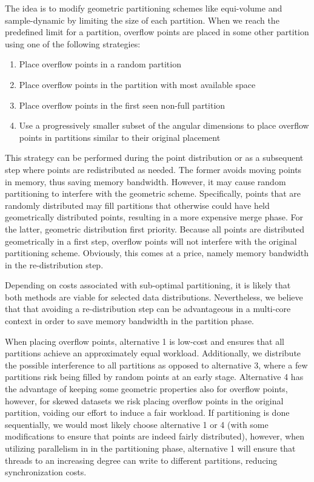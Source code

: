 \documentclass[12pt,a4paper,twoside]{report}
\begin{document}
The idea is to modify geometric partitioning schemes like equi-volume
and sample-dynamic by limiting the size of each partition. When we
reach the predefined limit for a partition, overflow points are placed
in some other partition using one of the following strategies:

\begin{enumerate}
	\item Place overflow points in a random partition
	\item Place overflow points in the partition with most available space
	\item Place overflow points in the first seen non-full partition
	\item Use a progressively smaller subset of the angular
	dimensions to place overflow points in partitions similar to
	their original placement
\end{enumerate}

This strategy can be performed during the point distribution or as a
subsequent step where points are redistributed as needed. The former
avoids moving points in memory, thus saving memory bandwidth. However,
it may cause random partitioning to interfere with the geometric
scheme. Specifically, points that are randomly distributed may
fill partitions that otherwise could have held geometrically
distributed points, resulting in a more expensive merge phase. For the
latter, geometric distribution first priority. Because all points are
distributed geometrically in a first step, overflow points will not
interfere with the original partitioning scheme. Obviously, this comes
at a price, namely memory bandwidth in the re-distribution step.

Depending on costs associated with sub-optimal partitioning, it is
likely that both methods are viable for selected data distributions.
Nevertheless, we believe that that avoiding a re-distribution step can
be advantageous in a multi-core context in order to save memory
bandwidth in the partition phase.

When placing overflow points, alternative 1 is low-cost and ensures
that all partitions achieve an approximately equal workload.
Additionally, we distribute the possible interference to all
partitions as opposed to alternative 3, where a few partitions risk
being filled by random points at an early stage. Alternative 4 has the
advantage of keeping some geometric properties also for overflow
points, however, for skewed datasets we risk placing overflow points
in the original partition, voiding our effort to induce a fair
workload. If partitioning is done sequentially, we would most likely
choose alternative 1 or 4 (with some modifications to ensure that
points are indeed fairly distributed), however, when utilizing
parallelism in in the partitioning phase, alternative 1 will ensure
that threads to an increasing degree can write to different
partitions, reducing synchronization costs.
\end{document}
